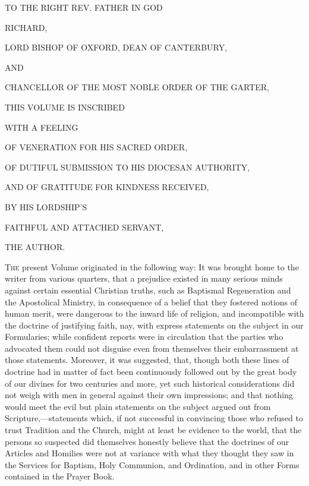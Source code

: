 



TO THE RIGHT REV. FATHER IN GOD



RICHARD,



LORD BISHOP OF OXFORD, DEAN OF CANTERBURY,

AND

CHANCELLOR OF THE MOST NOBLE ORDER OF THE GARTER,



THIS VOLUME IS INSCRIBED



WITH A FEELING

OF VENERATION FOR HIS SACRED ORDER,

OF DUTIFUL SUBMISSION TO HIS DIOCESAN AUTHORITY,

AND OF GRATITUDE FOR KINDNESS RECEIVED,

BY HIS LORDSHIP'S

FAITHFUL AND ATTACHED SERVANT,



THE AUTHOR.








T\textsc{he} present Volume originated in the following way: It was brought
home to the writer from various quarters, that a prejudice existed in
many serious minds against certain essential Christian truths, such as
Baptismal Regeneration and the Apostolical Ministry, in consequence of
a belief that they fostered notions of human merit, were dangerous to
the inward life of religion, and incompatible with the doctrine of
justifying faith, nay, with express statements on the subject in our
Formularies; while confident reports were in circulation that the
parties who advocated them could not disguise even from themselves
their embarrassment at those statements. Moreover, it was suggested,
that, though both these lines of doctrine had in matter of fact been
continuously followed out by the great body of our divines for two
centuries and more, yet such historical considerations did not weigh
with men in general against their own impressions; and that nothing
would meet the evil but plain statements on the subject argued out
from Scripture,—statements which, if not successful in convincing
those who refused to trust Tradition and the Church, might at least be
evidence to the world, that the persons so suspected did themselves
honestly believe that the doctrines of our Articles and Homilies were
not at variance with what they thought they saw in the Services for
Baptism, Holy Communion, and Ordination, and in other Forms contained
in the Prayer Book.


